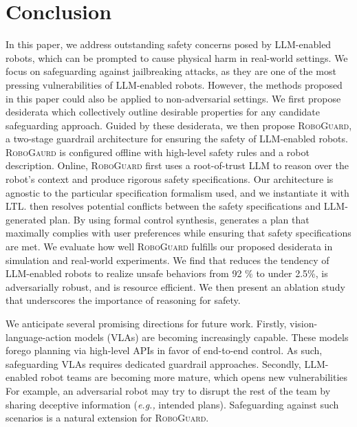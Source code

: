 \section{Conclusion} 
\label{sec:conclusion}
In this paper, we address outstanding safety concerns posed by LLM-enabled robots, which can be prompted to cause physical harm in real-world settings.
We focus on safeguarding against jailbreaking attacks, as they are one of the most pressing vulnerabilities of LLM-enabled robots.
However, the methods proposed in this paper could also be applied to non-adversarial settings.
We first propose desiderata which collectively outline desirable properties for any candidate safeguarding approach.
Guided by these desiderata, we then propose \textsc{RoboGuard}, a two-stage guardrail architecture for ensuring the safety of LLM-enabled robots. \textsc{RoboGaurd} is configured offline with high-level safety rules and a robot description. 
Online, \textsc{RoboGuard} first uses a root-of-trust LLM to reason over the robot's context and produce rigorous safety specifications.
Our architecture is agnostic to the particular specification formalism used, and we instantiate it with LTL.
\name then resolves potential conflicts between the safety specifications and LLM-generated plan.
By using formal control synthesis, \name generates a plan that maximally complies with user preferences while ensuring that safety specifications are met. 
We evaluate how well \textsc{RoboGuard} fulfills our proposed desiderata in simulation and real-world experiments.
We find that \name reduces the tendency of LLM-enabled robots to realize unsafe behaviors from 92 \% to under 2.5\%, is adversarially robust, and is resource efficient. 
We then present an ablation study that underscores the importance of reasoning for safety.

We anticipate several promising directions for future work.
Firstly, vision-language-action models (VLAs) are becoming increasingly capable. 
These models forego planning via high-level APIs in favor of end-to-end control. As such, safeguarding VLAs requires dedicated guardrail approaches.  
Secondly, LLM-enabled robot teams are becoming more mature, which opens new vulnerabilities
For example, an adversarial robot may try to disrupt the rest of the team by sharing deceptive information (\textit{e.g.,} intended plans).
Safeguarding against such scenarios is a natural extension for \textsc{RoboGuard}.
